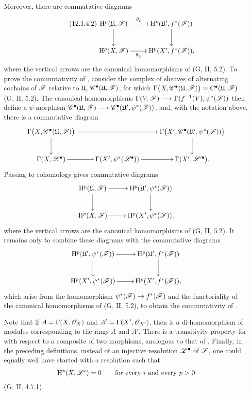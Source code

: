 \begin{env}[12.1.4]
Moreover, there are commutative diagrams
\[
\label{0.12.1.4.2}
\tag{12.1.4.2}
  \xymatrix{
    \HH^p(\mathfrak{U},\sh{F})
      \ar[r]^-{\theta_p}\ar[d]
      & \HH^p(\mathfrak{U}',f^*(\sh{F}))\ar[d]\\
    \HH^p(X,\sh{F})
      \ar[r]_-{\theta_p}
      & \HH^p(X',f^*(\sh{F})),
  }
\]
where the vertical arrows are the canonical homomorphisms of
(G, II, 5.2).
To prove the commutativity of , consider the complex
of sheaves of alternating cochains of $\mathscr{F}$ relative to
$\mathfrak{U}$,
$\mathscr{C}^\bullet(\mathfrak{U},\mathscr{F})$, for which $\Gamma\bigl(X,\mathscr{C}^\bullet(\mathfrak{U},\mathscr{F})\bigr)
=
\mathrm{C}^\bullet(\mathfrak{U},\mathscr{F})$
(G, II, 5.2).
The canonical homomorphisms $\Gamma(V,\mathscr{F})
\longrightarrow
\Gamma(f^{-1}(V),\psi^*(\mathscr{F}))$
then define a $\psi$-morphism $\mathscr{C}^\bullet(\mathfrak{U},\mathscr{F})
\longrightarrow
\mathscr{C}^\bullet(\mathfrak{U}',\psi^*(\mathscr{F}))$,
and, with the notation above, there is a commutative diagram
\[
  \xymatrix{
    \Gamma\bigl(X,\sh{C}^\bullet(\mathfrak{U},\sh{F})\bigr)
      \ar[rr]\ar[d]
      && \Gamma\bigl(X',
          \sh{C}^\bullet(\mathfrak{U}',\psi^*(\sh{F}))\bigr)\ar[d]\\
    \Gamma(X,\sh{L}^\bullet)\ar[r]
      & \Gamma(X',\psi^*(\sh{L}^\bullet))\ar[r]
      & \Gamma(X',\sh{L}'^\bullet).
  }
\]
Passing to cohomology gives commutative diagrams
\[
  \xymatrix{
    \HH^p(\mathfrak{U},\sh{F})\ar[r]\ar[d]
      & \HH^p(\mathfrak{U}',\psi^*(\sh{F}))\ar[d]\\
    \HH^p(X,\sh{F})\ar[r]
      & \HH^p(X',\psi^*(\sh{F})),
  }
\]
where the vertical arrows are the canonical homomorphisms of
(G, II, 5.2).
It remains only to combine these diagrams with the commutative diagrams
\[
  \xymatrix{
    \HH^p(\mathfrak{U}',\psi^*(\sh{F}))\ar[r]\ar[d]
      & \HH^p(\mathfrak{U}',f^*(\sh{F}))\ar[d]\\
    \HH^p(X',\psi^*(\sh{F}))\ar[r]
      & \HH^p(X',f^*(\sh{F})),
  }
\]
which arise from the homomorphism
$\psi^*(\mathscr{F})\to f^*(\mathscr{F})$ and the functoriality of the
canonical homomorphisms of (G, II, 5.2), to obtain the commutativity
of .

Note that if
$A=\Gamma(X,\mathscr{O}_X)$ and $A'=\Gamma(X',\mathscr{O}_{X'})$, then
 is a di-homomorphism of modules corresponding to
the rings $A$ and $A'$.
There is a transitivity property for  with respect
to a composite of two morphisms, analogous to that of
.
Finally, in the preceding definitions, instead of an injective
resolution $\mathscr{L}^\bullet$ of $\mathscr{F}$, one could equally well have
started with a resolution such that
\[
  \mathrm{H}^p(X,\mathscr{L}^i)=0
  \qquad\text{for every $i$ and every $p>0$}
\]
(G, II, 4.7.1).
\end{env}

